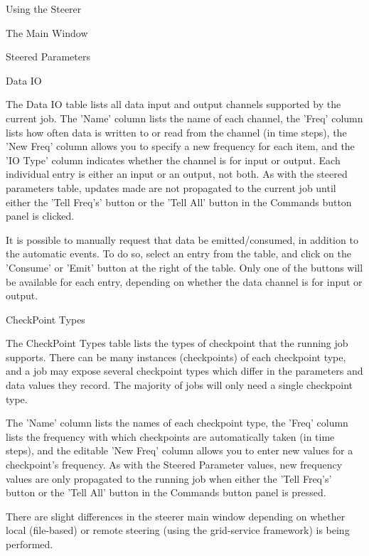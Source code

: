 \documentclass[a4paper,twoside]{article}
\begin{document}
\begin{section}{Using the Steerer}
\begin{subsection}{The Main Window}
\begin{subsubsection}{Steered Parameters}
\end{subsubsection} %

\begin{subsubsection}{Data IO}

The Data IO table lists all data input and output channels supported
by the current job. The 'Name' column lists the name of each channel,
the 'Freq' column lists how often data is written to or read from the
channel (in time steps), the 'New Freq' column allows you to specify a
new frequency for each item, and the 'IO Type' column indicates
whether the channel is for input or output.  Each individual entry is
either an input or an output, not both. As with the steered parameters
table, updates made are not propagated to the current job until either
the 'Tell Freq's' button or the 'Tell All' button in the Commands
button panel is clicked.

It is possible to manually request that data be emitted/consumed, in
addition to the automatic events. To do so, select an entry from the
table, and click on the 'Consume' or 'Emit' button at the right of the
table. Only one of the buttons will be available for each entry,
depending on whether the data channel is for input or output.

\end{subsubsection} %

\begin{subsubsection}{CheckPoint Types}

The CheckPoint Types table lists the types of checkpoint that the
running job supports. There can be many instances (checkpoints) of
each checkpoint type, and a job may expose several checkpoint types
which differ in the parameters and data values they record. The
majority of jobs will only need a single checkpoint type.

The 'Name' column lists the names of each checkpoint type, the 'Freq'
column lists the frequency with which checkpoints are automatically
taken (in time steps), and the editable 'New Freq' column allows you
to enter new values for a checkpoint's frequency. As with the Steered
Parameter values, new frequency values are only propagated to the
running job when either the 'Tell Freq's' button or the 'Tell All'
button in the Commands button panel is pressed.

There are slight differences in the steerer main window depending on
whether local (file-based) or remote steering (using the grid-service
framework) is being performed.


\end{subsubsection}
\end{subsection}
\end{section}
\end{document}

